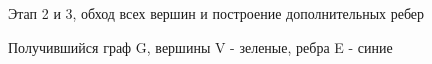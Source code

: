 \documentclass[a4paper, 14pt]{article}
\begin{document}
	\begin{figure}[h]
		\caption{Этап 2 и 3, обход всех вершин и построение дополнительных ребер }
		\label{ris:image}
	\end{figure}
	
	\begin{figure}[h]
		\caption{Получившийся граф G, вершины V - зеленые, ребра E - синие }
		\label{ris:image}
	\end{figure}
	
\end{document}
